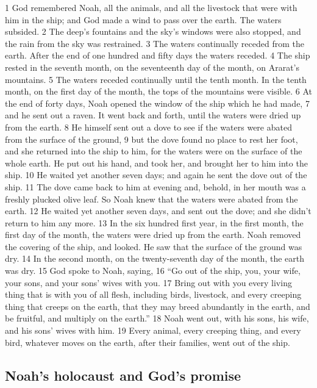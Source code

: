 {1} God remembered Noah, all the animals, and all the livestock that
were with him in the ship; and God made a wind to pass over the earth.
The waters subsided. {2} The deep's fountains and the sky's windows were
also stopped, and the rain from the sky was restrained. {3} The waters
continually receded from the earth. After the end of one hundred and
fifty days the waters receded. {4} The ship rested in the seventh month,
on the seventeenth day of the month, on Ararat's mountains. {5} The
waters receded continually until the tenth month. In the tenth month, on
the first day of the month, the tops of the mountains were visible. {6}
At the end of forty days, Noah opened the window of the ship which he
had made, {7} and he sent out a raven. It went back and forth, until the
waters were dried up from the earth. {8} He himself sent out a dove to
see if the waters were abated from the surface of the ground, {9} but
the dove found no place to rest her foot, and she returned into the ship
to him, for the waters were on the surface of the whole earth. He put
out his hand, and took her, and brought her to him into the ship. {10}
He waited yet another seven days; and again he sent the dove out of the
ship. {11} The dove came back to him at evening and, behold, in her
mouth was a freshly plucked olive leaf. So Noah knew that the waters
were abated from the earth. {12} He waited yet another seven days, and
sent out the dove; and she didn't return to him any more. {13} In the
six hundred first year, in the first month, the first day of the month,
the waters were dried up from the earth. Noah removed the covering of
the ship, and looked. He saw that the surface of the ground was dry.
{14} In the second month, on the twenty-seventh day of the month, the
earth was dry. {15} God spoke to Noah, saying, {16} ``Go out of the
ship, you, your wife, your sons, and your sons' wives with you. {17}
Bring out with you every living thing that is with you of all flesh,
including birds, livestock, and every creeping thing that creeps on the
earth, that they may breed abundantly in the earth, and be fruitful, and
multiply on the earth.'' {18} Noah went out, with his sons, his wife,
and his sons' wives with him. {19} Every animal, every creeping thing,
and every bird, whatever moves on the earth, after their families, went
out of the ship.

\hypertarget{noahs-holocaust-and-gods-promise}{%
\subsection{Noah's holocaust and God's
promise}\label{noahs-holocaust-and-gods-promise}}

